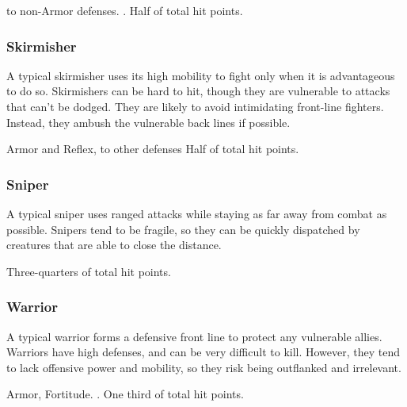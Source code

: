         to non-Armor defenses.
       .
       Half of total hit points.

    \subsubsection{Skirmisher}
      A typical skirmisher uses its high mobility to fight only when it is advantageous to do so.
      Skirmishers can be hard to hit, though they are vulnerable to attacks that can't be dodged.
      They are likely to avoid intimidating front-line fighters.
      Instead, they ambush the vulnerable back lines if possible.

        Armor and Reflex,  to other defenses
       
       Half of total hit points.

    \subsubsection{Sniper}
      A typical sniper uses ranged attacks while staying as far away from combat as possible.
      Snipers tend to be fragile, so they can be quickly dispatched by creatures that are able to close the distance.

       Three-quarters of total hit points.

    \subsubsection{Warrior}
      A typical warrior forms a defensive front line to protect any vulnerable allies.
      Warriors have high defenses, and can be very difficult to kill.
      However, they tend to lack offensive power and mobility, so they risk being outflanked and irrelevant.

        Armor,  Fortitude.
       .
       One third of total hit points.

